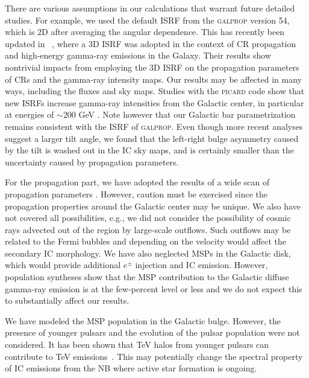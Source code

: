 \documentclass[doublespace,nopageskip]{VTthesis} %
\begin{document}
There are various assumptions in our calculations that warrant future detailed studies. For example, we used the default ISRF from the \textsc{galprop} version 54, which is 2D after averaging the angular dependence. This has recently been updated in ~\citet{2017ApJ...846...67P,2018ApJ...856...45J}, where a 3D ISRF was adopted in the context of CR propagation and high-energy gamma-ray emissions in the Galaxy. Their results show nontrivial impacts from employing the 3D ISRF on the propagation parameters of CRs and the gamma-ray intensity maps. Our results may be affected in many ways, including the fluxes and sky maps. Studies with the \textsc{picard} code show that new ISRFs increase gamma-ray intensities from the Galactic center, in particular at energies of $\sim 200 $ GeV \cite{2019APh...107....1N}. Note however that our Galactic bar parametrization remains consistent with the ISRF of \textsc{galprop}. Even though more recent analyses suggest a larger tilt angle, we found that the left-right bulge asymmetry caused by the tilt is washed out in the IC sky maps, and is certainly smaller than the uncertainty caused by propagation parameters.

For the propagation part, we have adopted the results of a wide scan of propagation parameters \cite{2016ApJ...824...16J}. However, caution must be exercised since the propagation properties around the Galactic center may be unique. We also have not covered all possibilities, e.g., we did not consider the possibility of cosmic rays advected out of the region by large-scale outflows. Such outflows may be related to the Fermi bubbles \cite{2015ApJ...808..107C} and depending on the velocity would affect the secondary IC morphology. We have also neglected MSPs in the Galactic disk, which would provide additional $e^\pm$ injection and IC emission. However, population syntheses show that the MSP contribution to the Galactic diffuse gamma-ray emission is at the few-percent level or less \cite{2018ApJ...863..199G} and we do not expect this to substantially affect our results.

We have modeled the MSP population in the Galactic bulge. However, the presence of younger pulsars and the evolution of the pulsar population were not considered. It has been shown that TeV halos from younger pulsars can contribute to TeV emissions~\cite{2018PDU....21...40H}. This may potentially change the spectral property of IC emissions from the NB where active star formation is ongoing.
\end{document}
